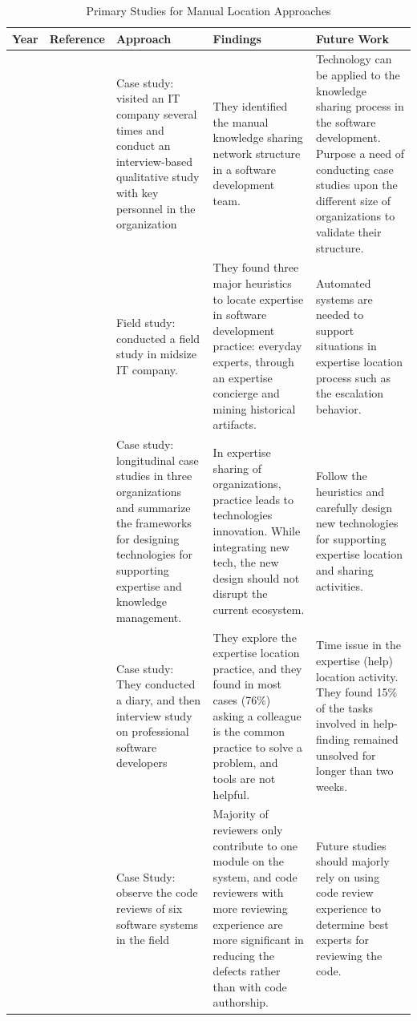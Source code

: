 \begin{table}[htbp]
\centering
\small
\settowidth{}
\begin{tabulary}{\textwidth}{LLLLL}
\hline
\textbf{Year}           & \textbf{Reference}          & \textbf{Approach}           & \textbf{Findings}  & \textbf{Future Work}\\ \hline
\citeyear{waterson1997dynamics} & \citeauthor{waterson1997dynamics}\cite{waterson1997dynamics} & Case study: visited an IT company several times and conduct an interview-based qualitative study with key personnel in the organization & They identified the manual knowledge sharing network structure in a software development team. & Technology can be applied to the knowledge sharing process in the software development. Purpose a need of conducting case studies upon the different size of organizations to validate their structure. \\ \hline
\citeyear{mcdonald1998just} & \citeauthor{mcdonald1998just}\cite{mcdonald1998just} & Field study: conducted a field study in midsize IT company. & They found three major heuristics to locate expertise in software development practice: everyday experts, through an expertise concierge and mining historical artifacts. & Automated systems are needed to support situations in expertise location process such as the escalation behavior. \\\hline
\citeyear{pipek2012bridging} & \citeauthor{pipek2012bridging}\cite{pipek2012bridging} & Case study: longitudinal case studies in three organizations and summarize the frameworks for designing technologies for supporting expertise and knowledge management. & In expertise sharing of organizations, practice leads to technologies innovation. While integrating new tech, the new design should not disrupt the current ecosystem. & Follow the heuristics and carefully design new technologies for supporting expertise location and sharing activities. \\\hline
\citeyear{yarosh2013need} & \citeauthor{yarosh2013need}\cite{yarosh2013need} & Case study: They conducted a diary, and then interview study on professional software developers & They explore the expertise location practice, and they found in most cases (76\%) asking a colleague is the common practice to solve a problem, and tools are not helpful. & Time issue in the expertise (help) location activity. They found 15\% of the tasks involved in help-finding remained unsolved for longer than two weeks. \\\hline
\citeyear{thongtanunam2016revisiting} & \citeauthor{thongtanunam2016revisiting}\cite{thongtanunam2016revisiting} & Case Study: observe the code reviews of six software systems in the field & Majority of reviewers only contribute to one module on the system, and code reviewers with more reviewing experience are more significant in reducing the defects rather than with code authorship. & Future studies should majorly rely on using code review experience to determine best experts for reviewing the code.\\ \hline
\end{tabulary}
\caption{Primary Studies for Manual Location Approaches}
\label{tab:manual}
\end{table}
